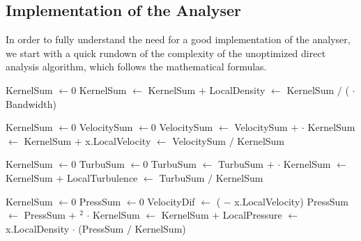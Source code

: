\subsection{Implementation of the Analyser}\label{s3:analyser_implementation}

In order to fully understand the need for a good implementation of the analyser, we start with a quick rundown of the complexity of the unoptimized direct analysis algorithm, which follows the mathematical formulas.

\begin{algorithmic}[1]

    \State KernelSum $\gets 0$
        \State KernelSum $\gets$ KernelSum $+$ 
    \EndFor
    \State LocalDensity $\gets$ KernelSum $/$ ( $\cdot$ Bandwidth)
\EndFor

    \State KernelSum $\gets 0$
    \State VelocitySum $\gets 0$
        \State VelocitySum $\gets$ VelocitySum $+$  $\cdot$ 
        \State KernelSum $\gets$ KernelSum $+$ 
    \EndFor
    \State x.LocalVelocity $\gets$ VelocitySum $/$ KernelSum
\EndFor

    \State KernelSum $\gets 0$
    \State TurbuSum $\gets 0$
        \State TurbuSum $\gets$ TurbuSum $+$  $\cdot$ 
        \State KernelSum $\gets$ KernelSum $+$ 
    \EndFor
    \State LocalTurbulence $\gets$ TurbuSum $/$ KernelSum
\EndFor

    \State KernelSum $\gets 0$
    \State PressSum $\gets 0$
        \State VelocityDif $\gets$ ( $-$ x.LocalVelocity)
        \State PressSum $\gets$ PressSum $+$ $^2$ $\cdot$ 
        \State KernelSum $\gets$ KernelSum $+$ 
    \EndFor
    \State LocalPressure $\gets$ x.LocalDensity $\cdot$ (PressSum $/$ KernelSum)
\EndFor
\EndFunction
\end{algorithmic}

%
%    
%   
%
%    


